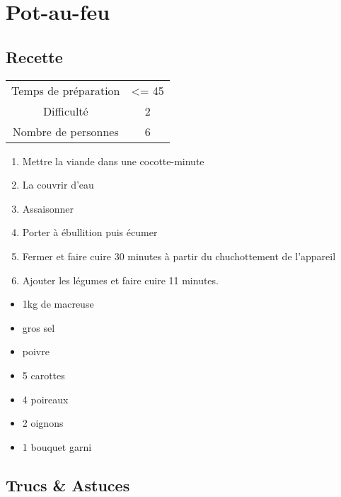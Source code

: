 \newpage
\section{Pot-au-feu}
    \label{sec:Pot-au-feu}
    \subsection{Recette}
    \vspace{1cm}


    \begin{center}
        \begin{tabular}{c|c}
            Temps de préparation & <= 45 \\
            Difficulté & 2 \\
            Nombre de personnes & 6 
        \end{tabular}
    \end{center}{}

    \vspace{1cm}
    \hline
    \vspace{1cm}

    \begin{minipage}{.7\textwidth}
        \begin{enumerate}
            \item Mettre la viande dans une cocotte-minute
	    \item La couvrir d'eau
	    \item Assaisonner
	    \item Porter à ébullition puis écumer
	    \item Fermer et faire cuire 30 minutes à partir du chuchottement de l'appareil
	    \item Ajouter les légumes et faire cuire 11 minutes.

        \end{enumerate}
    \end{minipage}
    \begin{minipage}{.3\textwidth}
        \begin{flushleft}
        \begin{itemize}
            \item 1kg de macreuse
	    \item gros sel
	    \item poivre
	    \item 5 carottes
	    \item 4 poireaux
	    \item 2 oignons
	    \item 1 bouquet garni

        \end{itemize}
        \end{flushleft}
    \end{minipage}
    
    \vspace{1cm}
    \hline
    \vspace{1cm}
    
    \subsection{Trucs \& Astuces}
        
